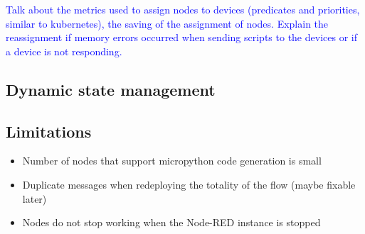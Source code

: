 \textcolor{blue}{Talk about the metrics used to assign nodes to devices (predicates and priorities, similar to kubernetes), the saving of the assignment of nodes. Explain the reassignment if memory errors occurred when sending scripts to the devices or if a device is not responding.}

\subsection{Dynamic state management}\label{sec:dynamic_state_management}

\subsection{Limitations}\label{sec:limitations}

\begin{itemize}
    \item Number of nodes that support micropython code generation is small
    \item Duplicate messages when redeploying the totality of the flow (maybe fixable later)
    \item Nodes do not stop working when the Node-RED instance is stopped
\end{itemize}
